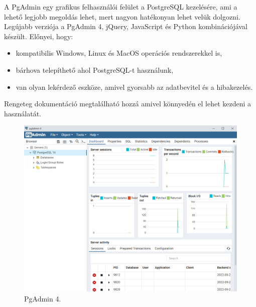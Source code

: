 A PgAdmin\cite{PgAdmin} egy grafikus felhasználói felület a PostgreSQL kezelésére, ami a lehető legjobb megoldás lehet, mert nagyon hatékonyan lehet velük dolgozni. Legújabb verziója a PgAdmin 4, jQuery, JavaScript és Python kombinációjával készült. Előnyei, hogy:

\begin{itemize}
\item kompatibilis Windows, Linux és MacOS operációs rendszerekkel is,
\item bárhova telepíthető ahol PostgreSQL-t használunk,
\item van olyan lekérdező eszköze, amivel gyorsabb az adatbevitel és a hibakezelés.
\end{itemize}

Rengeteg dokumentáció megtalálható hozzá amivel könnyedén el lehet kezdeni a használatát.

\begin{figure}[h]
\centering
\includegraphics[scale=0.3]{images/PgAdmin.png}
\caption{PgAdmin 4.}
\label{fig:PgAdmin 4}
\end{figure}
\newpage

